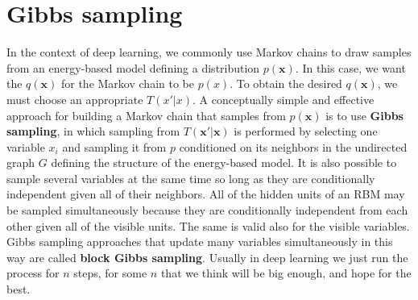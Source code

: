 \section{Gibbs sampling}
In the context of deep learning, we commonly use Markov chains to draw
samples from an energy-based model defining a distribution $p(\textbf{x})$. In this case, we want the $q(\textbf{x})$ for the Markov chain to be $p(x)$. To obtain the desired $q(\textbf{x})$, we must choose an appropriate $T(x' | x)$.\newline\newline
A conceptually simple and effective approach for building a Markov chain
that samples from $p(\textbf{x})$ is to use \textbf{Gibbs sampling}, in which sampling from $T(\textbf{x}' | \textbf{x})$ is performed by selecting one variable $x_i$ and sampling it from $p$ conditioned on its neighbors in the undirected graph $G$ defining the structure of the energy-based model.\newline\newline
It is also possible to sample several variables at the same time so long as they are conditionally independent given all of their neighbors. All of the hidden units of an RBM may be sampled simultaneously because they are conditionally independent from each other given all of the visible units. The same is valid also for the visible variables. Gibbs sampling approaches that update many variables simultaneously in this way are called \textbf{block Gibbs sampling}.\newline\newline
Usually in deep learning we just run the process for $n$ steps, for some $n$ that we think will be big enough, and hope for the best.
